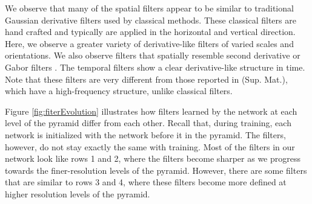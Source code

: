 \documentclass[10pt,twocolumn,letterpaper]{article}
\begin{document}
We observe that many of the spatial filters appear to be similar to traditional Gaussian derivative filters used by classical methods.
These classical filters are hand crafted and typically are applied in the horizontal and vertical direction.
Here, we observe a greater variety of derivative-like filters of varied scales and orientations.
We also observe filters that spatially resemble second derivative or Gabor filters \cite{adelson1985spatiotemporal}.
The temporal filters show a clear derivative-like structure in time.
Note that these filters are very different from those reported in \cite{dosovitskiy2015flownet} (Sup. Mat.), which have a high-frequency structure, unlike classical filters. 

Figure \ref{fig:fiterEvolution} illustrates how filters learned by the network at each level of the pyramid differ from each other. 
Recall that, during training, each network is initialized with the network before it in the pyramid.
The filters, however, do not stay exactly the same with training.
Most of the filters in our network look like rows 1 and 2, where the filters become sharper as we progress towards the finer-resolution levels of the pyramid. 
However, there are some filters that are similar to rows 3 and 4, where these filters become more defined at higher resolution levels of the pyramid. 

\end{document}
